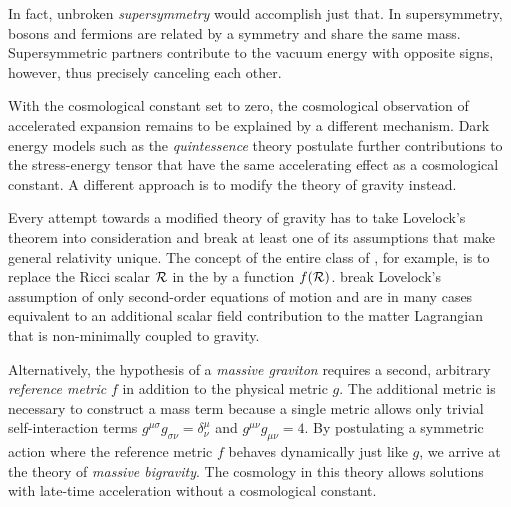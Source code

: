 \documentclass[12pt,parskip=half]{scrreprt}
\newcommand{\addref}{\todo[color=black!20]{ref.}}
\begin{document}
In fact, unbroken \emph{supersymmetry} would accomplish just that. In supersymmetry, bosons and fermions are related by a symmetry and share the same mass. Supersymmetric partners contribute to the vacuum energy with opposite signs, however, thus precisely canceling each other.

With the cosmological constant set to zero, the cosmological observation of accelerated expansion  remains to be explained by a different mechanism. Dark energy models such as the \emph{quintessence} theory \addref postulate further contributions to the stress-energy tensor that have the same accelerating effect as a cosmological constant. A different approach is to modify the theory of gravity instead.

Every attempt towards a modified theory of gravity has to take Lovelock's theorem into consideration and break at least one of its assumptions that make general relativity unique. The concept of the entire class of \emph{}, for example, is to replace the Ricci scalar \(\mathcal{R}\) in the  by a function \(f(\mathcal{R})\).
 break Lovelock's assumption of only second-order equations of motion and are in many cases equivalent to an additional scalar field contribution to the matter Lagrangian that is non-minimally coupled to gravity. \addref

Alternatively, the hypothesis of a \emph{massive graviton} requires a second, arbitrary \emph{reference metric} \(f\) in addition to the physical metric \(g\). The additional metric is necessary to construct a mass term because a single metric allows only trivial self-interaction terms \(g^{\mu\sigma}g_{\sigma\nu}=\delta^\mu_\nu\) and \(g^{\mu\nu}g_{\mu\nu} = 4\). By postulating a symmetric action where the reference metric \(f\) behaves dynamically just like \(g\), we arrive at the theory of \emph{massive bigravity}.
The cosmology in this theory allows solutions with late-time acceleration without a cosmological constant. \addref
\end{document}
